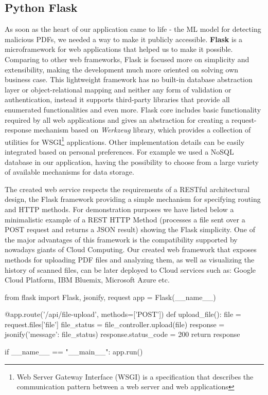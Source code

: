 \subsection{Python Flask}
As soon as the heart of our application came to life - the ML model for detecting malicious PDFs, we needed a way to make it publicly accessible. \textbf{Flask} is a microframework for web applications that helped us to make it possible. Comparing to other web frameworks, Flask is focused more on simplicity and extensibility, making the development much more oriented on solving own business case. This lightweight framework has no built-in database abstraction layer or object-relational mapping and neither any form of validation or authentication, instead it supports third-party libraries that provide all enumerated functionalities and even more. Flask core includes basic functionality required by all web applications and gives an abstraction for creating a request-response mechanism based on \textit{Werkzeug} library, which provides a collection of utilities for WSGI\footnote{Web Server Gateway Interface (WSGI) is a specification that describes the communication pattern between a web server and web applications} applications. Other implementation details can be easily integrated based on personal preferences. For example we used a NoSQL database in our application, having the possibility to choose from a large variety of available mechanisms for data storage. \par
The created web service respects the requirements of a RESTful architectural design, the Flask framework providing a simple mechanism for specifying routing and HTTP methods. For demonstration purposes we have listed below a minimalistic example of a REST HTTP Method (processes a file sent over a POST request and returns a JSON result) showing the Flask simplicity. One of the major advantages of this framework is the compatibility supported by nowadays giants of Cloud Computing. Our created web framework that exposes methods for uploading PDF files and analyzing them, as well as visualizing the history of scanned files, can be later deployed to Cloud services such as: Google Cloud Platform, IBM Bluemix, Microsoft Azure etc. 

\newpage

\begin{python}
from flask import Flask, jsonify, request
app = Flask(__name__)

@app.route('/api/file-upload', methods=['POST'])
def upload_file():
	file = request.files['file']
	file_status = file_controller.upload(file)
	response = jsonify({'message': file_status})
	response.status_code = 200
	return response

if __name__ == "__main__":
    app.run()
\end{python}


